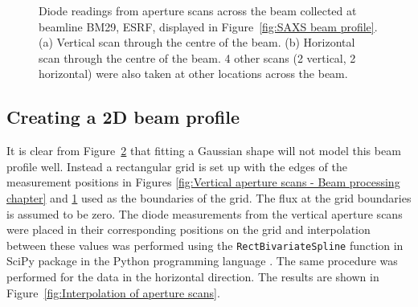 \begin{figure}
\begin{subfigure}[b]{0.9\textwidth}
            \caption{}
            \label{fig:Horizontal aperture scans - Beam processing chapter}
    \end{subfigure}
    \caption{Diode readings from aperture scans across the beam collected at beamline BM29, ESRF, displayed in Figure~\ref{fig:SAXS beam profile}. (a) Vertical scan through the centre of the beam. (b) Horizontal scan through the centre of the beam. 4 other scans (2 vertical, 2 horizontal) were also taken at other locations across the beam.}
    \label{fig:Aperture scans - Beam processing chapter}
\end{figure}

\subsection{Creating a 2D beam profile}
\label{sub:Creating a 2D beam profile}
It is clear from Figure~\ref{fig:Aperture scans - Beam processing chapter} that fitting a Gaussian shape will not model this beam profile well.
Instead a rectangular grid is set up with the edges of the measurement positions in Figures \ref{fig:Vertical aperture scans - Beam processing chapter} and \ref{fig:Horizontal aperture scans - Beam processing chapter} used as the boundaries of the grid.
The flux at the grid boundaries is assumed to be zero.
The diode measurements from the vertical aperture scans were placed in their corresponding positions on the grid and interpolation between these values was performed using the \verb+RectBivariateSpline+ function in SciPy package in the Python programming language \cite{jones2014scipy}.
The same procedure was performed for the data in the horizontal direction.
The results are shown in Figure~\ref{fig:Interpolation of aperture scans}.
